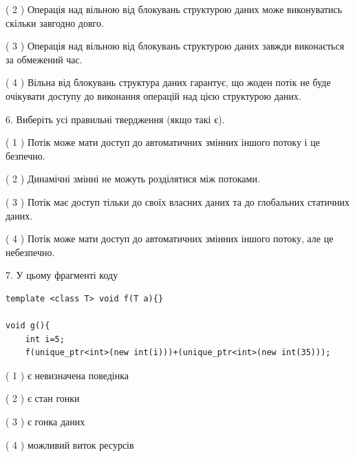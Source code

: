 \documentclass[12pt, ukrainian]{article}
\begin{document}
\begin {large}
{( 2 ) Операція над вільною від блокувань структурою даних може виконуватись скільки завгодно довго.%

( 3 ) Операція над вільною від блокувань структурою даних завжди виконається за обмежений час.%

( 4 ) Вільна від блокувань структура даних гарантує, що жоден потік не буде очікувати доступу до виконання операцій над цією структурою даних.%
\newpage



\vspace{5mm}
6. Виберіть усі правильні твердження (якщо такі є).\par
\vspace{2mm}

( 1 ) Потік може мати доступ до автоматичних змінних іншого потоку і це безпечно.%

( 2 ) Динамічні змінні не можуть розділятися між потоками.%

( 3 ) Потік має доступ тільки до своїх власних даних та до глобальних статичних даних.%

( 4 ) Потік може мати доступ до автоматичних змінних іншого потоку, але це небезпечно.%


\vspace{5mm}
7. У цьому фрагменті коду
\begin{verbatim}
template <class T> void f(T a){}

void g(){
    int i=5;
    f(unique_ptr<int>(new int(i)))+(unique_ptr<int>(new int(35)));
\end{verbatim}
( 1 ) є невизначена поведінка%

( 2 ) є стан гонки%

( 3 ) є гонка даних%

( 4 ) можливий виток ресурсів%
}
\end {large}
\end{document}
